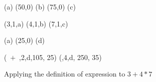 



\begin {figure}

\Draw


\MarkLoc(a)
\Move(50,0)
\MarkLoc(b)
\Move(75,0)
\MarkLoc(c)

\boxItDefault(3,1,a)
\boxItDefault(4,1,b)
\boxItDefault(7,1,c)

\MoveToLoc(a)
\Move(25,0)
\MarkLoc(d)

\boxIt(~$  +  $~,2,d,105, 25)
\boxIt(\hspace{135pt}\hfill*\hspace{10pt},4,d, 250, 35)

\EndDraw


\caption {Applying the definition of 
expression to $3+4*7$ }
\label {fig:exprsBoxedAmb1}

\end {figure}


